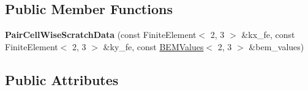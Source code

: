 \subsection*{Public Member Functions}
\begin{DoxyCompactItemize}
\item 
\mbox{\label{structLaplaceBEM_1_1PairCellWiseScratchData_a728f0084479845ef359dde917ee2927d}} 
{\bfseries Pair\+Cell\+Wise\+Scratch\+Data} (const Finite\+Element$<$ 2, 3 $>$ \&kx\+\_\+fe, const Finite\+Element$<$ 2, 3 $>$ \&ky\+\_\+fe, const \hyperlink{classLaplaceBEM_1_1BEMValues}{B\+E\+M\+Values}$<$ 2, 3 $>$ \&bem\+\_\+values)
\end{DoxyCompactItemize}
\subsection*{Public Attributes}
